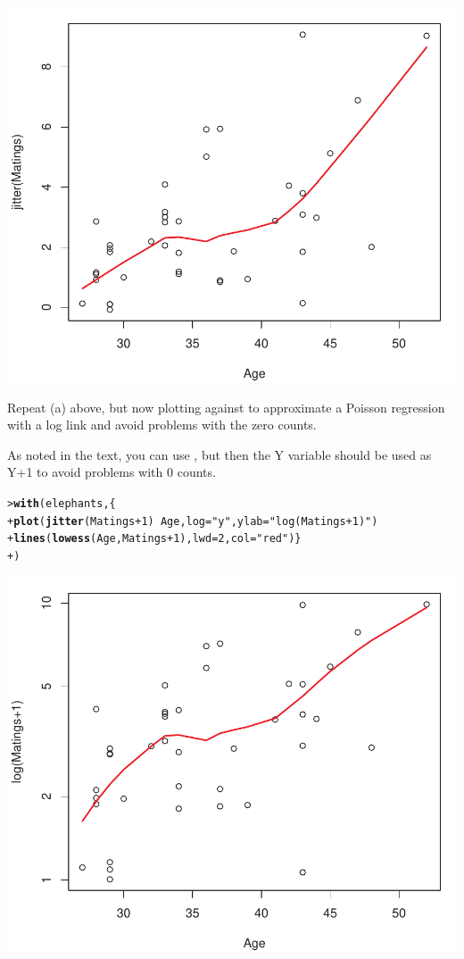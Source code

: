 \documentclass[10pt]{report}\usepackage[]{graphicx}\usepackage[]{color}
\makeatletter
\newcommand{\hlnum}[1]{\textcolor[rgb]{0.686,0.059,0.569}{#1}}%
\newcommand{\hlstr}[1]{\textcolor[rgb]{0.192,0.494,0.8}{#1}}%
\newcommand{\hlopt}[1]{\textcolor[rgb]{0,0,0}{#1}}%
\newcommand{\hlstd}[1]{\textcolor[rgb]{0.345,0.345,0.345}{#1}}%
\newcommand{\hlkwc}[1]{\textcolor[rgb]{0.333,0.667,0.333}{#1}}%
\newcommand{\hlkwd}[1]{\textcolor[rgb]{0.737,0.353,0.396}{\textbf{#1}}}%
\newenvironment{kframe}{%
 \def\at@end@of@kframe{}%
 \ifinner\ifhmode%
  \def\at@end@of@kframe{\end{minipage}}%
  \begin{minipage}{\columnwidth}%
 \fi\fi%
 \def\FrameCommand##1{\hskip\@totalleftmargin \hskip-\fboxsep
 \colorbox{shadecolor}{##1}\hskip-\fboxsep
     \hskip-\linewidth \hskip-\@totalleftmargin \hskip\columnwidth}%
 \MakeFramed {\advance\hsize-\width
   \@totalleftmargin\z@ \linewidth\hsize
   \@setminipage}}%
 {\par\unskip\endMakeFramed%
 \at@end@of@kframe}
\newenvironment{knitrout}{}{} %
\renewenvironment{knitrout}{\small\renewcommand{\baselinestretch}{.85}}{} %
\makeatother
\begin{document}
\begin{Exercises}
\begin{enumerate*}
\begin{ans}
\begin{knitrout}
\centerline{\includegraphics[width=.5\textwidth]{soln/fig/ex11_1a-1} }



\end{knitrout}

    \end{ans}
    
    \item Repeat (a) above, but now plotting  against  to approximate a
    Poisson regression with a log link and avoid problems with the zero counts.
    \begin{ans}
    As noted in the text, you can use , but then the Y variable should be used as Y+1 to
    avoid problems with 0 counts.
\begin{knitrout}\footnotesize
{}\color{fgcolor}\begin{kframe}
\begin{alltt}
\hlstd{> }\hlkwd{with}\hlstd{(elephants, \{}
\hlstd{+ }        \hlkwd{plot}\hlstd{(}\hlkwd{jitter}\hlstd{(Matings}\hlopt{+}\hlnum{1}\hlstd{)} \hlopt{~} \hlstd{Age,} \hlkwc{log}\hlstd{=}\hlstr{"y"}\hlstd{,} \hlkwc{ylab}\hlstd{=}\hlstr{"log(Matings+1)"}\hlstd{)}
\hlstd{+ }        \hlkwd{lines}\hlstd{(}\hlkwd{lowess}\hlstd{(Age, Matings}\hlopt{+}\hlnum{1}\hlstd{),} \hlkwc{lwd}\hlstd{=}\hlnum{2}\hlstd{,} \hlkwc{col}\hlstd{=}\hlstr{"red"}\hlstd{)\}}
\hlstd{+ }        \hlstd{)}
\end{alltt}
\end{kframe}

\centerline{\includegraphics[width=.5\textwidth]{soln/fig/ex11_1b-1} }




\end{knitrout}
\end{ans}
\end{enumerate*}
\end{Exercises}
\end{document}
